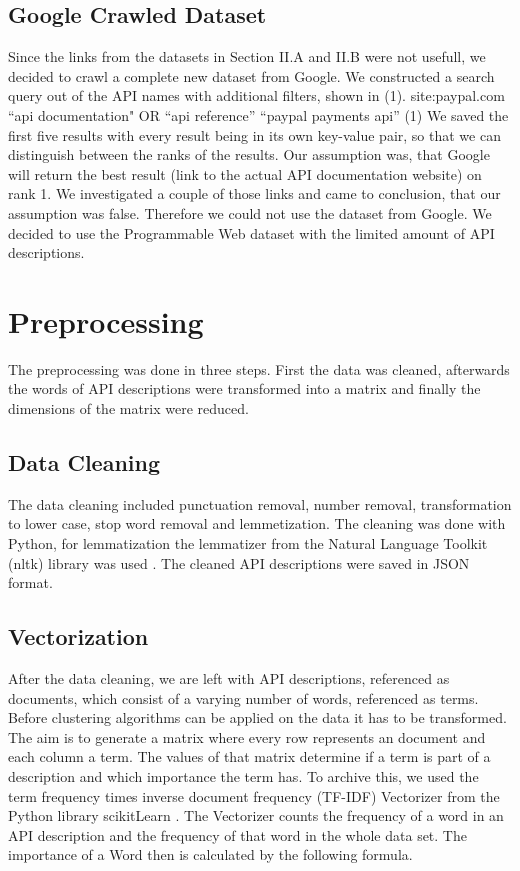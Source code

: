 \documentclass[a4paper]{IEEEtran}
\begin{document}
\subsection{Google Crawled Dataset}
Since the links from the datasets in Section II.A and II.B were not usefull, we decided to crawl a complete new dataset from Google. We constructed a search query out of the API names with additional filters, shown in (1).
site:paypal.com “api documentation" OR “api reference” “paypal payments api”	(1)
We saved the first five results with every result being in its own key-value pair, so that we can distinguish between the ranks of the results. Our assumption was, that Google will return the best result (link to the actual API documentation website) on rank 1. We investigated a couple of those links and came to conclusion, that our assumption was false. Therefore we could not use the dataset from Google.
We decided to use the Programmable Web dataset with the limited amount of API descriptions.

\section{Preprocessing}
The preprocessing was done in three steps. First the data was cleaned, afterwards the words of API descriptions were transformed into a matrix and finally the dimensions of the matrix were reduced.

\subsection{Data Cleaning}
The data cleaning included punctuation removal, number removal, transformation to lower case, stop word removal and lemmetization. The cleaning was done with Python, for lemmatization the lemmatizer from the Natural Language Toolkit (nltk) library was used \cite{bird2009natural}. The cleaned API descriptions were saved in JSON format.

\subsection{Vectorization}
After the data cleaning, we are left with API descriptions, referenced as documents, which consist of a varying number of words, referenced as terms. Before clustering algorithms can be applied on the data it has to be transformed. The aim is to generate a matrix where every row represents an document and each column a term. The values of that matrix determine if a term is part of a description and which importance the term has. To archive this, we used the term frequency times inverse document frequency (TF-IDF) Vectorizer from the Python library scikitLearn \cite{scikit-learn}. The Vectorizer counts the frequency of a word in an API description and the frequency of that word in the whole data set. The importance of a Word then is calculated by the following formula.
\end{document}
